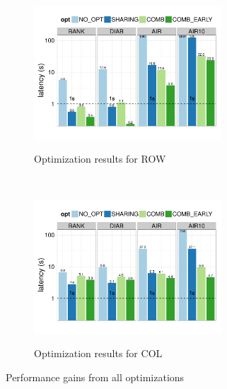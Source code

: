 \begin{figure}[h]
\vspace{-5pt}
	\centering
	\begin{subfigure}{1\linewidth}
		\centering
		{\includegraphics[width=7cm] {Images/all_opt_real_data_row.pdf}}
		\vspace{-15pt}
		\caption{Optimization results for ROW}
		\label{fig:share_prune_row}
	\end{subfigure}\\
	\begin{subfigure}{1\linewidth}
		\centering
		{\includegraphics[width=7cm] {Images/all_opt_real_data_col.pdf}}
		\vspace{-15pt}
		\caption{Optimization results for COL}
		\label{fig:share_prune_col}
	\end{subfigure}
	\vspace{-10pt}
	\caption{Performance gains from all optimizations}
	\label{fig:all_opt_with_pruning}
	\vspace{-15pt}
\end{figure}
 
